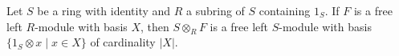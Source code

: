 Let $S$ be a ring with identity and $R$ a subring of $S$ containing $1_S$. If $F$ is a free left $R$-module with basis $X$, then $S \otimes_R F$ is a free left $S$-module with basis $\{1_S \otimes x \mid x \in X\}$ of cardinality $|X|$.
